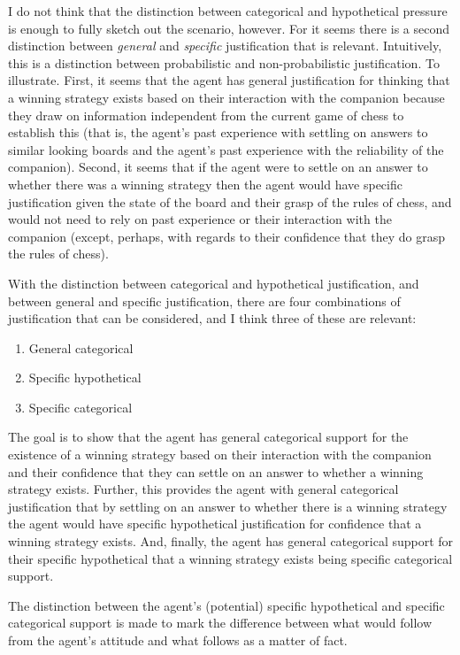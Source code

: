 \documentclass[10pt]{article}
\begin{document}
I do not think that the distinction between categorical and hypothetical pressure is enough to fully sketch out the scenario, however.
For it seems there is a second distinction between \emph{general} and \emph{specific} justification that is relevant.
Intuitively, this is a distinction between probabilistic and non-probabilistic justification.
To illustrate.
First, it seems that the agent has general justification for thinking that a winning strategy exists based on their interaction with the companion because they draw on information independent from the current game of chess to establish this (that is, the agent's past experience with settling on answers to similar looking boards and the agent's past experience with the reliability of the companion).
Second, it seems that if the agent were to settle on an answer to whether there was a winning strategy then the agent would have specific justification given the state of the board and their grasp of the rules of chess, and would not need to rely on past experience or their interaction with the companion (except, perhaps, with regards to their confidence that they do grasp the rules of chess).

With the distinction between categorical and hypothetical justification, and between general and specific justification, there are four combinations of justification that can be considered, and I think three of these are relevant:

\begin{enumerate}
\item General categorical
\item Specific hypothetical
\item Specific categorical
\end{enumerate}

The goal is to show that the agent has general categorical support for the existence of a winning strategy based on their interaction with the companion and their confidence that they can settle on an answer to whether a winning strategy exists.
Further, this provides the agent with general categorical justification that by settling on an answer to whether there is a winning strategy the agent would have specific hypothetical justification for confidence that a winning strategy exists.
And, finally, the agent has general categorical support for their specific hypothetical that a winning strategy exists being specific categorical support.

The distinction between the agent's (potential) specific hypothetical and specific categorical support is made to mark the difference between what would follow from the agent's attitude and what follows as a matter of fact.
\end{document}
